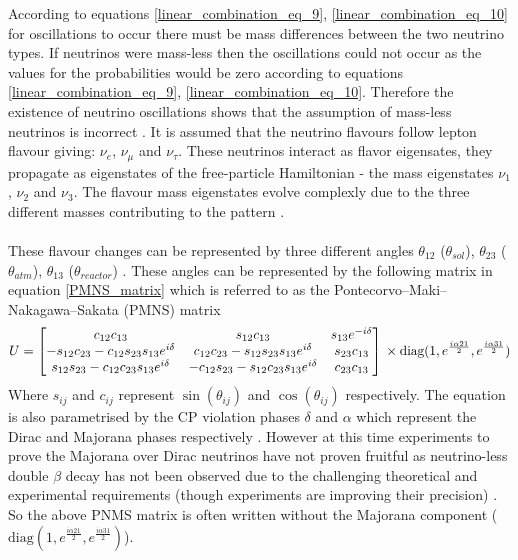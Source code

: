 According to equations \ref{linear_combination_eq_9}, \ref{linear_combination_eq_10} for oscillations to occur there must be mass differences between the two neutrino types. If neutrinos were mass-less then the oscillations could not occur as the values for the probabilities would be zero according to equations \ref{linear_combination_eq_9}, \ref{linear_combination_eq_10}. Therefore the existence of neutrino oscillations shows that the assumption of mass-less neutrinos is incorrect \cite{griffiths2008book}\cite{griffiths2008neutrinoOscillations} \cite{sassaroli1999neutrino}. It is assumed that the neutrino flavours follow lepton flavour giving: $\nu_e$, $\nu_\mu$ and $\nu_\tau$. These neutrinos interact as flavor eigensates, they propagate as eigenstates of the free-particle Hamiltonian - the mass eigenstates $\nu_1$, $\nu_2$ and $\nu_3$. The flavour mass eigenstates evolve complexly due to the three different masses contributing to the pattern  \cite{griffiths2008book} \cite{griffiths2008neutrinoOscillations}. 
\\\\These flavour changes can be represented by three different angles $\theta_{12}$ ($\theta_{sol}$), $\theta_{23}$ ($\theta_{atm}$), $\theta_{13}$ ($\theta_{reactor}$) \cite{Olive_2014} \cite{griffiths2008book} \cite{griffiths2008neutrinoOscillations}. These angles can be represented by the following  matrix in equation \ref{PMNS_matrix} which is referred to as the Pontecorvo–Maki–Nakagawa–Sakata (PMNS) matrix
\begin{equation}
U
    =
    \begin{bmatrix}
        c_{12}c_{13} & s_{12}c_{13} & s_{13}e^{-i\delta}\\
        -s_{12}c_{23} - c_{12}s_{23}s_{13}e^{i\delta} & c_{12}c_{23} - s_{12}s_{23}s_{13}e^{i\delta} & s_{23}c_{13} \\
        s_{12}s_{23} - c_{12}c_{23}s_{13}e^{i\delta} & -c_{12}s_{23} - s_{12}c_{23}s_{13}e^{i\delta} & c_{23}c_{13} 
    \end{bmatrix}
    \\ \times \text{diag}(1, e^{\frac{i\alpha21}{2}} , e^{\frac{i\alpha31}{2}})
    \label{PMNS_matrix}
\end{equation}
Where $s_{ij}$ and $c_{ij}$ represent $\sin(\theta_{ij})$ and $\cos(\theta_{ij})$ respectively. The equation is also parametrised by the CP violation phases $\delta$ and $\alpha$ which represent the Dirac and Majorana phases respectively \cite{Olive_2014}. However at this time experiments to prove the Majorana over Dirac neutrinos have not proven fruitful as neutrino-less double $\beta$ decay has not been observed due to the challenging theoretical and experimental requirements (though experiments are improving their precision) \cite{Cardani_2019}.  So the above PNMS matrix is often written without the Majorana component ($\text{diag}(1, e^{\frac{i\alpha21}{2}} , e^{\frac{i\alpha31}{2}})$). 
